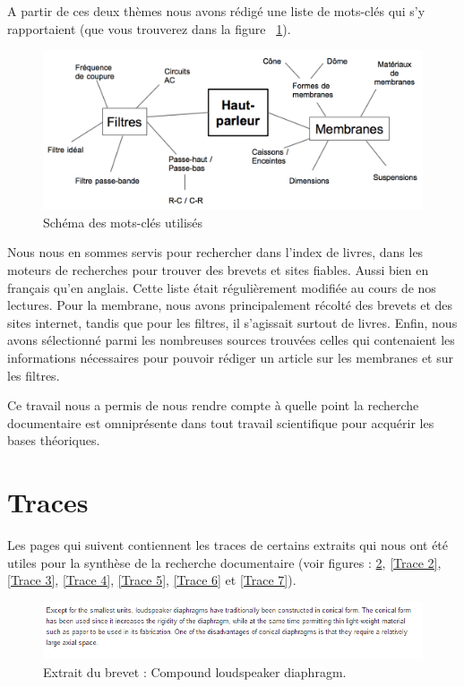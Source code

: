 A partir de ces deux thèmes nous avons rédigé une liste de mots-clés qui s'y rapportaient (que vous trouverez dans la figure ~\ref{Schema mots-clefs}).

\begin{figure}
\begin{center}
\includegraphics[scale=0.35]{img/Mots-clefs.png}
\end{center}
\caption{Schéma des mots-clés utilisés}
 \label{Schema mots-clefs}
\end{figure}

Nous nous en sommes servis pour rechercher dans l'index de livres, dans les moteurs de recherches pour trouver des brevets et sites fiables. Aussi bien en français qu'en anglais. Cette liste était régulièrement modifiée au cours de nos lectures. Pour la membrane, nous avons principalement récolté des brevets et des sites internet, tandis que pour les filtres, il s'agissait surtout de livres. 
Enfin, nous avons sélectionné parmi les nombreuses sources trouvées celles qui contenaient les informations nécessaires pour pouvoir rédiger un article sur les membranes et sur les filtres.
\newline

Ce travail nous a permis de nous rendre compte à quelle point la recherche documentaire est omniprésente dans tout travail scientifique pour acquérir les bases théoriques.
\newline

\section{Traces}

Les pages qui suivent contiennent les traces de certains extraits qui nous ont été utiles pour la synthèse de la recherche documentaire (voir figures : \ref{Trace 1}, \ref{Trace 2}, \ref{Trace 3}, \ref{Trace 4}, \ref{Trace 5}, \ref{Trace 6} et \ref{Trace 7}).

\begin{figure}[h]
\begin{center}
\includegraphics[scale=0.8]{img/Trace1-brevet-US-3153463.png}
\end{center}
\caption{Extrait du brevet \cite{f1964compound} : Compound loudspeaker diaphragm.} %
\label{Trace 1}
\end{figure}

